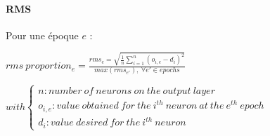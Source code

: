 \paragraph{RMS}
  Pour une époque $e$ :
  \begin{center}
    \begin{large}
    $ rms\ proportion_{e} = \frac{ rms_{e} = \sqrt{ \frac{1}{n} \sum \limits_{i=1}^{n} 
    ( o_{i,e} - d_{i} )^2 }}{max(rms_{e'}),\ \forall e' \in epochs } $
    \end{large}
  $ with \left\lbrace \begin{array}{lll} n : number\ of\ neurons\ on\ the\ output\ 
  layer\\o_{i,e} : value\ obtained\ for\ the\ i^{th}\ neuron\ at\ the\ e^{th}\ epoch\\d_{i} : 
  value\ desired \ for\ the\ i^{th}\ neuron\end{array} \right.$
  \end{center}